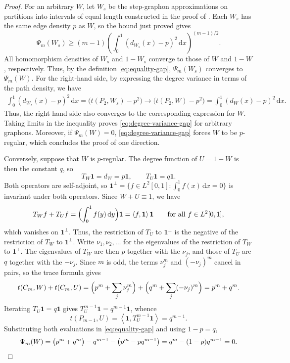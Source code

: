 \documentclass[11pt]{article}
\theoremstyle{remark}
\numberwithin{equation}{section}
\newcommand{\one}{\mathbf 1}
\newcommand{\ip}[2]{\left\langle #1,#2\right\rangle}
\newcommand{\dd}{\,\mathrm d}
\newcommand{\tC}[2]{t(C_{#1},#2)}
\newcommand{\tP}[2]{t(P_{#1},#2)}
\newcommand{\Tker}[1]{T_{#1}}
\newcommand{\dW}{d_W}
\begin{document}
\begin{proof}
  For an arbitrary $W$, let $W_s$ be the step-graphon approximations on
  partitions into intervals of equal length constructed in the proof of
  . Each $W_s$ has the same edge density $p$ as
  $W$, so the bound just proved gives
  \[
    \Psi_m(W_s)\ge(m-1)
    \left(\int_0^1(d_{W_s}(x)-p)^2\dd x\right)^{(m-1)/2}.
  \]
  All homomorphism densities of $W_s$ and $1-W_s$ converge to those of
  $W$ and $1-W$, respectively. Thus, by the definition \eqref{eq:equality-gap},
  $\Psi_m(W_s)$ converges to $\Psi_m(W)$.
  For the right-hand side, by expressing the degree variance in terms of the path density, we have
  \begin{align*}
    \int_0^1(d_{W_s}(x)-p)^2\dd x
    =\Big(\tP2{W_s}-p^2\Big)
    \longrightarrow\Big(\tP2W-p^2\Big)
    =\int_0^1(\dW(x)-p)^2\dd x.
  \end{align*}
  Thus, the right-hand side also converges to the corresponding expression
  for $W$. Taking limits in the inequality proves
  \eqref{eq:degree-variance-gap} for arbitrary graphons.
  Moreover, if $\Psi_m(W)=0$, \eqref{eq:degree-variance-gap} forces $W$ to be $p$-regular, which concludes the proof of one direction.

  Conversely, suppose that $W$ is $p$-regular.
  The degree function of $U=1-W$ is then the constant $q$, so
  \[
    \Tker W\one=\dW=p\one,
    \qquad
    \Tker U\one=q\one .
  \]
  Both operators are self-adjoint, so
  $\one^\perp=\{f\in L^2[0,1]:\int_0^1f(x)\dd x=0\}$ is invariant under both operators.
  Since
  $W+U\equiv1$, we have
  \[
    \Tker Wf+\Tker Uf=\Bigl(\int_0^1f(y)\dd y\Bigr)\one=\ip f\one\one
    \qquad\text{for all }f\in L^2[0,1],
  \]
  which vanishes on
  $\one^\perp$. Thus, the restriction of $\Tker U$ to $\one^\perp$ is the negative of the restriction of $\Tker W$ to $\one^\perp$.
  Write $\nu_1,\nu_2,\ldots$ for the eigenvalues of the restriction of $\Tker W$ to
  $\one^\perp$.
  The eigenvalues of $\Tker W$ are then $p$ together with the $\nu_j$, and those of
  $\Tker U$ are $q$ together with the $-\nu_j$.
  Since $m$ is odd, the terms $\nu_j^m$ and $(-\nu_j)^m$ cancel in pairs, so the
  trace formula gives
  \[
    \tC mW+\tC mU
    =\Bigl(p^m+\sum_j\nu_j^m\Bigr)+\Bigl(q^m+\sum_j(-\nu_j)^m\Bigr)
    =p^m+q^m.
  \]
  Iterating $\Tker U\one=q\one$ gives $\Tker U^{m-1}\one=q^{m-1}\one$, whence
  \[
    \tP{m-1}U=\ip\one{\Tker U^{m-1}\one}=q^{m-1}.
  \]
  Substituting both evaluations in \eqref{eq:equality-gap} and using $1-p=q$,
  \[
    \Psi_m(W)
    =\bigl(p^m+q^m\bigr)-q^{m-1}-\bigl(p^m-pq^{m-1}\bigr)
    =q^m-(1-p)q^{m-1}
    =0. \qedhere
  \]
\end{proof}
\end{document}
